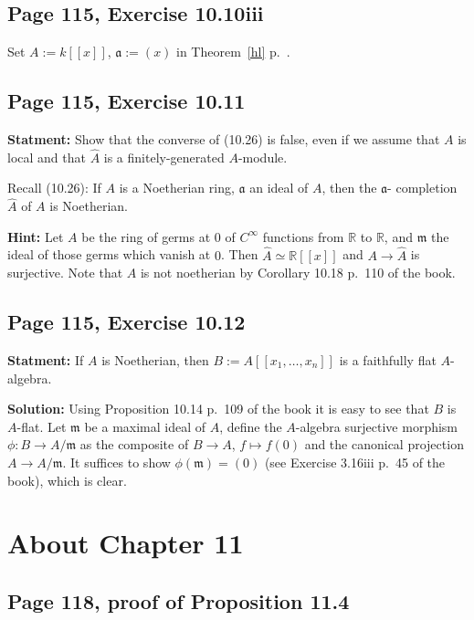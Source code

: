 \documentclass[parskip=half,fontsize=12pt]{scrartcl}%
\newcommand{\mf}{\mathfrak}
\newcommand{\aaa}{\mf a}
\newcommand{\mmm}{\mf m}
\newcommand{\nnn}{\mf n}
\begin{document}
\subsection{Page 115, Exercise 10.10iii}%

Set $A:=k[[x]]$, $\aaa:=(x)$ in Theorem~\ref{hl} p.~\pageref{hl}. 

\subsection{Page 115, Exercise 10.11}%

\textbf{Statment:} Show that the converse of (10.26) is false, even if we assume that $A$ is local and that $\widehat A$ is a finitely-generated $A$-module.

Recall (10.26): If $A$ is a Noetherian ring, $\aaa$ an ideal of $A$, then the $\aaa$-
completion $\widehat A$ of $A$ is Noetherian.

\textbf{Hint:} Let $A$ be the ring of germs at $0$ of $C^\infty$ functions from $\mathbb R$ to $\mathbb R$, and $\mmm$ the ideal of those germs which vanish at $0$. Then $\widehat A\simeq\mathbb R[[x]]$ and $A\to\widehat A$ is surjective. Note that $A$ is not noetherian by Corollary 10.18 p.~110 of the book. 

\subsection{Page 115, Exercise 10.12}%

\textbf{Statment:} If $A$ is Noetherian, then $B:=A[[x_1,\ldots,x_n]]$ is a faithfully flat $A$-algebra. 

\textbf{Solution:} Using Proposition 10.14 p.~109 of the book it is easy to see that $B$ is $A$-flat. Let $\mmm$ be a maximal ideal of $A$, define the $A$-algebra surjective morphism $\phi:B\to A/\mmm$ as the composite of $B\to A$, $f\mapsto f(0)$ and the canonical projection $A\to A/\mmm$. %
It suffices to show $\phi(\mmm)=(0)$ (see Exercise 3.16iii p.~45 of the book), which is clear. 

\section{About Chapter 11}%

\subsection{Page 118, proof of Proposition 11.4}%
\end{document}
